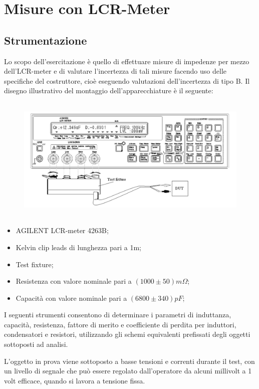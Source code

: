 \section{Misure con LCR-Meter}
\label{sec:lcr}

\subsection{Strumentazione}
\label{sub:strum}
Lo scopo dell’esercitazione è quello di effettuare misure di impedenze per mezzo 
dell’LCR-meter e di valutare l’incertezza di tali misure facendo uso delle specifiche 
del costruttore, cioè eseguendo valutazioni dell’incertezza di tipo B.
Il disegno illustrativo del montaggio dell’apparecchiature è il seguente:

\begin{figure}[h]
    \centering
    \includegraphics[height=6cm]{media/LCR_meter.png}
    \label{fig:LCR_meter}
\end{figure}
\FloatBarrier

\begin{itemize}
    \item AGILENT LCR-meter 4263B;
    \item Kelvin clip leads di lunghezza pari a 1m;
    \item Test fixture;
    \item Resistenza con valore nominale pari a $(1000\pm50)m\Omega$;
    \item Capacità con valore nominale pari a $(6800\pm340)pF$;
\end{itemize}


I seguenti strumenti consentono di determinare i parametri di induttanza, capacità, resistenza, fattore di merito e coefficiente di perdita per induttori, condensatori e resistori, utilizzando gli schemi equivalenti prefissati degli oggetti sottoposti ad analisi.

L'oggetto in prova viene sottoposto a basse tensioni e correnti durante il test, con un livello di segnale che può essere regolato dall'operatore da alcuni millivolt a 1 volt efficace, quando si lavora a tensione fissa.

